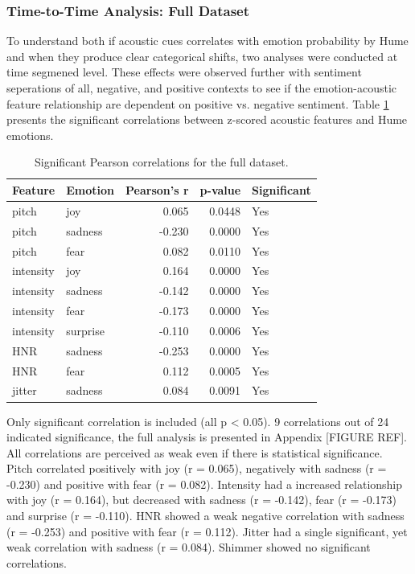 \subsubsection{Time-to-Time Analysis: Full Dataset}
To understand both if acoustic cues correlates with emotion probability by Hume and when they produce clear categorical shifts, two analyses were conducted at time segmened level. 
These effects were observed further with sentiment seperations of all, negative, and positive contexts to see if the emotion-acoustic feature relationship are dependent on positive vs. negative sentiment. 
Table \ref{tab:rq1_time_all_correlations} presents the significant correlations between z-scored acoustic features and Hume emotions.
\begin{table}[H]
    \centering
    \begin{tabular}{l l r r l}
      \toprule
      \textbf{Feature} & \textbf{Emotion} & \textbf{Pearson’s r} & \textbf{p-value} & \textbf{Significant} \\
      \midrule
        pitch      & joy     & 0.065         & 0.0448    & Yes         \\
        pitch      & sadness & -0.230        & 0.0000    & Yes         \\
        pitch      & fear    & 0.082         & 0.0110    & Yes         \\
        intensity  & joy     & 0.164         & 0.0000    & Yes         \\
        intensity  & sadness & -0.142        & 0.0000    & Yes         \\
        intensity  & fear    & -0.173        & 0.0000    & Yes         \\
        intensity  & surprise& -0.110        & 0.0006    & Yes         \\
        HNR        & sadness & -0.253        & 0.0000    & Yes         \\
        HNR        & fear    & 0.112         & 0.0005    & Yes         \\
        jitter     & sadness & 0.084         & 0.0091    & Yes         \\
      \bottomrule
    \end{tabular}
    \caption{Significant Pearson correlations for the full dataset.}
    \label{tab:rq1_time_all_correlations}
  \end{table}
 
  Only significant correlation is included (all p < 0.05). 9 correlations out of 24 indicated significance, the full analysis is presented in Appendix [FIGURE REF]. 
  All correlations are perceived as weak even if there is statistical significance. Pitch correlated positively with joy (r = 0.065), negatively with sadness (r = -0.230) and positive with fear (r = 0.082). 
  Intensity had a increased relationship with joy (r = 0.164), but decreased with sadness (r = -0.142), fear (r = -0.173) and surprise (r = -0.110). 
  HNR showed a weak negative correlation with sadness (r = -0.253) and positive with fear (r = 0.112). 
  Jitter had a single significant, yet weak correlation with sadness (r = 0.084). Shimmer showed no significant correlations. 

